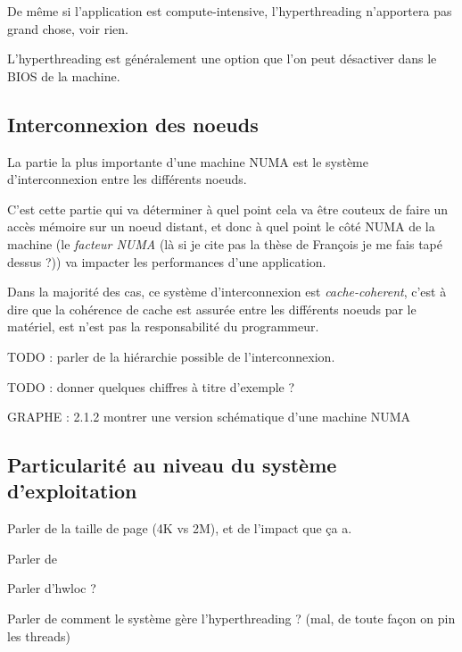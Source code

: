 De même si l'application est compute-intensive, l'hyperthreading n'apportera pas grand chose, voir rien.

L'hyperthreading est généralement une option que l'on peut désactiver dans le BIOS de la machine.


\subsection{Interconnexion des noeuds}\label{sec:context:numa:interconnect}

La partie la plus importante d'une machine NUMA est le système d'interconnexion entre les différents noeuds.

C'est cette partie qui va déterminer à quel point cela va être couteux de faire un accès mémoire sur un noeud distant, et donc à quel point le côté NUMA de la machine (le \emph{facteur NUMA} (là si je cite pas la thèse de François je me fais tapé dessus ?)) va impacter les performances d'une application.

Dans la majorité des cas, ce système d'interconnexion est \emph{cache-coherent}, c'est à dire que la cohérence de cache est assurée entre les différents noeuds par le matériel, est n'est pas la responsabilité du programmeur.

TODO : parler de la hiérarchie possible de l'interconnexion.

TODO : donner quelques chiffres à titre d'exemple ?

GRAPHE : 2.1.2 montrer une version schématique d'une machine NUMA


\subsection{Particularité au niveau du système d'exploitation}\label{sec:context:numa:os}


Parler de la taille de page (4K vs 2M), et de l'impact que ça a.

Parler de~\cite{Dobson2003}

Parler d'hwloc ?

Parler de comment le système gère l'hyperthreading ? (mal, de toute façon on pin les threads)



